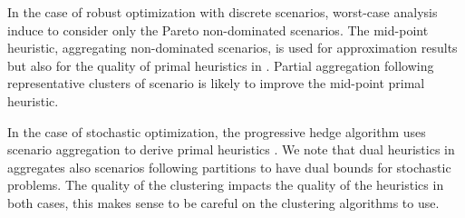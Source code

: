 \documentclass{meta}
\begin{document}
In the case of robust optimization with discrete scenarios, worst-case analysis induce to consider only the Pareto non-dominated scenarios. 
The mid-point heuristic, aggregating non-dominated scenarios, is used for approximation results but also
for the quality of primal heuristics in \cite{chassein2017scenario}.
Partial aggregation following representative clusters of scenario is likely to improve the mid-point primal heuristic.


In the case of stochastic optimization, the progressive hedge algorithm uses scenario aggregation
to derive primal heuristics \cite{rockafellar1991scenarios,haugen2001progressive}.
We note that dual heuristics in  \cite{dupin2018dual} aggregates also scenarios following partitions
to have dual bounds for stochastic problems.
The quality of the clustering impacts the quality of the heuristics in both cases,
this makes sense to be careful on the clustering algorithms to use.


% 
% 
% 
% 
% 
% 
% 
% 
% 




 
% 

\end{document}
